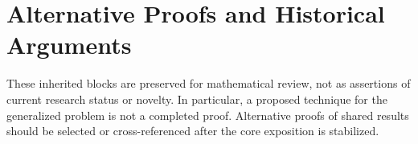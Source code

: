 \chapter{Alternative Proofs and Historical Arguments}
These inherited blocks are preserved for mathematical review, not as
assertions of current research status or novelty. In particular, a proposed
technique for the generalized problem is not a completed proof. Alternative
proofs of shared results should be selected or cross-referenced after the
core exposition is stabilized.




